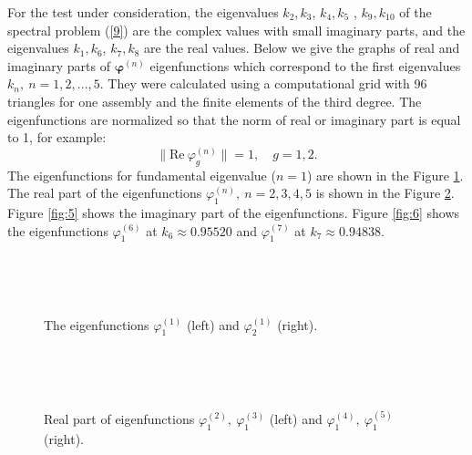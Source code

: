 \documentclass[authoryear]{elsarticle}
\begin{document}
For the test under consideration, the eigenvalues $k_2, k_3$, $k_4, k_5$ , $k_9, k_{10}$ 
of the spectral problem (\ref{9}) are the complex values with small imaginary parts, and the eigenvalues $k_1, k_6$, $k_7, k_8$ are the real values.
Below we give the graphs of real and imaginary parts of $\bm \varphi^{(n)}$ eigenfunctions which correspond to the first eigenvalues $k_n, \ n = 1, 2, ..., 5$. 
They were calculated using a computational grid with 96 triangles for one assembly and the finite elements of the third degree. The eigenfunctions are normalized so that the norm of real or imaginary part is equal to 1, for example:
\[
 \|\mathrm{Re} \ \varphi^{(n)}_g\| = 1, \quad g = 1,2. 
\] 
The eigenfunctions for fundamental eigenvalue ($n=1$) are shown in the Figure \ref{fig:3}.
The real part of the eigenfunctions $\varphi^{(n)}_1, \ n = 2,3,4,5$ is shown in the Figure \ref{fig:4}.
Figure \ref{fig:5} shows the imaginary part of the eigenfunctions. Figure \ref{fig:6} shows the eigenfunctions $\varphi^{(6)}_1$ at $k_6 \approx  0.95520$ and $\varphi^{(7)}_1$ at $k_7 \approx  0.94838$.

\begin{figure}[htp]
  \begin{center}
\begin{minipage}{0.49\linewidth}
 \\
\end{minipage}
\hfill
\begin{minipage}{0.49\linewidth}
 \\
\end{minipage}
\caption{The eigenfunctions $\varphi^{(1)}_1$ (left) and $\varphi^{(1)}_2$ (right).}
\label{fig:3}
  \end{center}
\end{figure}

\begin{figure}[htp]
  \begin{center}
\begin{minipage}{0.49\linewidth}
 \\
\end{minipage}
\hfill
\begin{minipage}{0.49\linewidth}
 \\
\end{minipage}
\caption{Real part of eigenfunctions $\varphi^{(2)}_1, \ \varphi^{(3)}_1$ (left) and $\varphi^{(4)}_1, \ \varphi^{(5)}_1$ (right).}
\label{fig:4}
  \end{center}
\end{figure}
\end{document}
